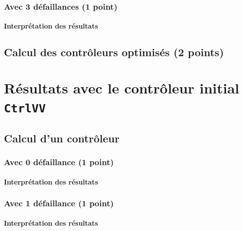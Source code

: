 \documentclass[a4paper]{book}
\begin{document}
\subsubsection{Avec 3 défaillances (1 point)}





\paragraph{Interprétation des résultats}



\subsection{Calcul des contrôleurs optimisés (2 points)}

\section{Résultats avec le contrôleur initial {\tt CtrlVV}}

\subsection{Calcul d'un contrôleur}

\subsubsection{Avec 0 défaillance (1 point)}





\paragraph{Interprétation des résultats}

\subsubsection{Avec 1 défaillance (1 point)}





\paragraph{Interprétation des résultats}
\end{document}
